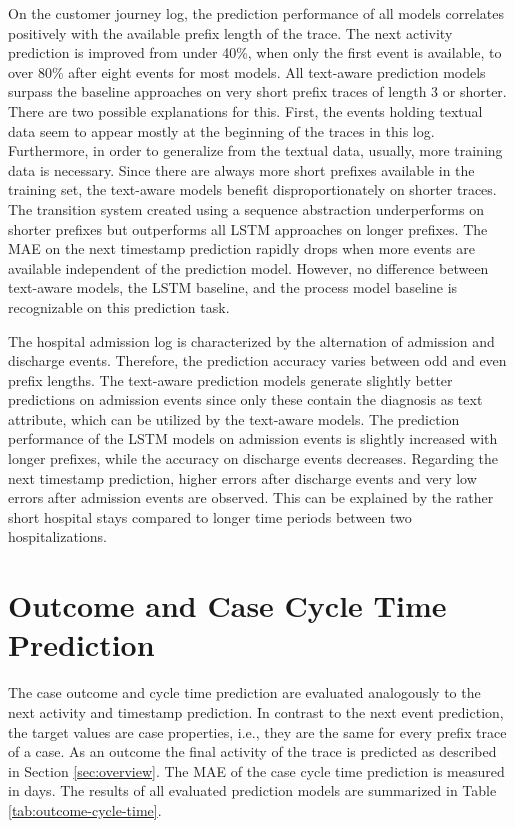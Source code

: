 On the customer journey log, the prediction performance of all models correlates positively with the available prefix length of the trace.
The next activity prediction is improved from under 40\%, when only the first event is available, to over 80\% after eight events for most models.
All text-aware prediction models surpass the baseline approaches on very short prefix traces of length 3 or shorter.
There are two possible explanations for this.
First, the events holding textual data seem to appear mostly at the beginning of the traces in this log.
Furthermore, in order to generalize from the textual data, usually, more training data is necessary.
Since there are always more short prefixes available in the training set, the text-aware models benefit disproportionately on shorter traces.
The transition system created using a sequence abstraction underperforms on shorter prefixes but outperforms all LSTM approaches on longer prefixes.
The MAE on the next timestamp prediction rapidly drops when more events are available independent of the prediction model.
However, no difference between text-aware models, the LSTM baseline, and the process model baseline is recognizable on this prediction task.

The hospital admission log is characterized by the alternation of admission and discharge events.
Therefore, the prediction accuracy varies between odd and even prefix lengths.
The text-aware prediction models generate slightly better predictions on admission events since only these contain the diagnosis as text attribute, which can be utilized by the text-aware models.
The prediction performance of the LSTM models on admission events is slightly increased with longer prefixes, while the accuracy on discharge events decreases.
Regarding the next timestamp prediction, higher errors after discharge events and very low errors after admission events are observed.
This can be explained by the rather short hospital stays compared to longer time periods between two hospitalizations.




\section{Outcome and Case Cycle Time Prediction}

The case outcome and cycle time prediction are evaluated analogously to the next activity and timestamp prediction.
In contrast to the next event prediction, the target values are case properties, i.e., they are the same for every prefix trace of a case.
As an outcome the final activity of the trace is predicted as described in Section \ref{sec:overview}.
The MAE of the case cycle time prediction is measured in days.
The results of all evaluated prediction models are summarized in Table \ref{tab:outcome-cycle-time}.

